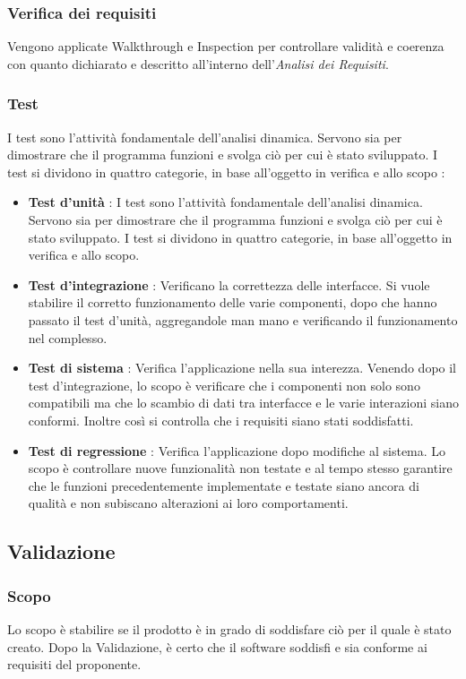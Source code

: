 \subsubsection{Verifica dei requisiti}
Vengono applicate Walkthrough e Inspection per controllare validità e coerenza con quanto dichiarato e descritto all’interno dell’\textit{Analisi dei Requisiti}.

\subsubsection{Test}
I test sono l’attività fondamentale dell’analisi dinamica. Servono sia per dimostrare che il programma funzioni e svolga ciò per cui è stato sviluppato. I test si dividono in quattro categorie, in base all’oggetto in verifica e allo scopo : 
\begin{itemize}
\item \textbf{Test d’unità} : I test sono l’attività fondamentale dell’analisi dinamica. Servono sia per dimostrare che il programma funzioni e svolga ciò per cui è stato sviluppato. I test si dividono in quattro categorie, in base all’oggetto in verifica e allo scopo.
\item \textbf{Test d’integrazione} : Verificano la correttezza delle interfacce. Si vuole stabilire il corretto funzionamento delle varie componenti, dopo che hanno passato il test d’unità, aggregandole man mano e verificando il funzionamento nel complesso.
\item \textbf{Test di sistema} : Verifica l’applicazione nella sua interezza. Venendo dopo il test d’integrazione, lo scopo è verificare che i componenti non solo sono compatibili ma che lo scambio di dati tra interfacce e le varie interazioni siano conformi. Inoltre così si controlla che i requisiti siano stati soddisfatti.
\item \textbf{Test di regressione} : Verifica l’applicazione dopo modifiche al sistema. Lo scopo è controllare nuove funzionalità non testate e al tempo stesso garantire che le funzioni precedentemente implementate e testate siano ancora di qualità e non subiscano alterazioni ai loro comportamenti.
\end{itemize}

\subsection{Validazione}
\subsubsection{Scopo}
Lo scopo è stabilire se il prodotto è in grado di soddisfare ciò per il quale è stato creato. Dopo la Validazione, è certo che il software soddisfi e sia conforme ai requisiti del proponente.

